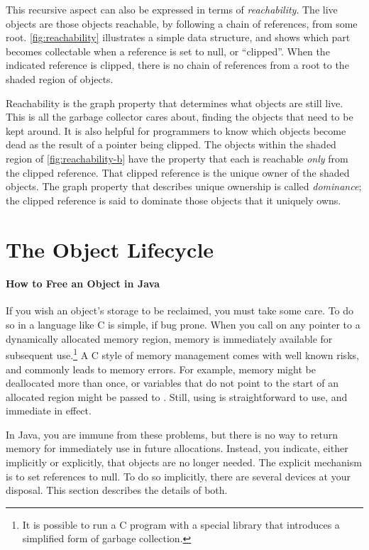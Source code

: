This recursive aspect can also be expressed in terms of \emph{reachability}.
 The live objects are those objects reachable, by following a
chain of references, from some root. \autoref{fig:reachability} illustrates a
simple data structure, and shows which part becomes collectable when a reference
is set to null, or ``clipped''. When the indicated reference is clipped, there is
no chain of references from a root to the shaded region of objects.

Reachability is the graph property that determines what objects are still live.
This is all the garbage collector cares about, finding the objects that need to
be kept around. It is also helpful for programmers to know which objects become
dead as the result of a pointer being clipped. The objects within the shaded
region of \autoref{fig:reachability-b} have the property that each is reachable
\emph{only} from the clipped reference. That clipped reference is the unique
owner of the shaded objects. The graph property that describes unique ownership
is called \emph{dominance};  the clipped reference is said to
dominate those objects that it uniquely owns.

\section{The Object Lifecycle}
\paragraph{How to Free an Object in Java}
\label{sec:natural-lifetime}

If you wish an object's storage to be reclaimed, you must take some care. To do
so in a language like C is simple, if bug prone. When you call  on any
pointer to a dynamically allocated memory region, memory is immediately available
for subsequent use.\footnote{It is possible to run a C program with a
special  library that introduces a simplified form of garbage
collection.} A C style of memory management comes with well known risks, and
commonly leads to memory errors. For example, memory might be deallocated more
than once, or variables that do not point to the start of an allocated region
might be passed to . Still, using  is straightforward to
use, and immediate in effect.

In Java, you are immune from these problems, but there is no way to return memory
for immediately use in future allocations. Instead, you indicate, either
implicitly or explicitly, that objects are no longer needed. The explicit
mechanism is to set references to null. To do so implicitly, there are several
devices at your disposal. This section describes the details of both.

